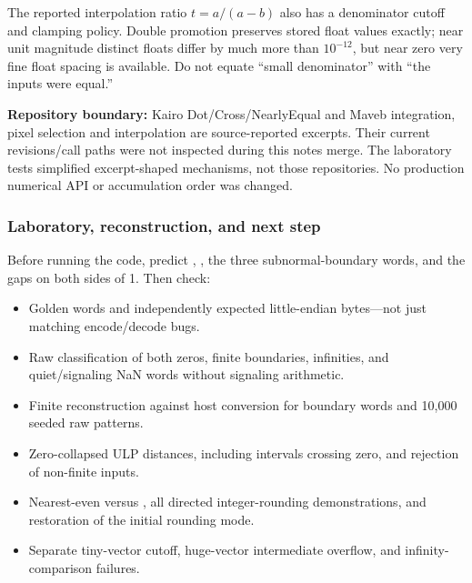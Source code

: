The reported interpolation ratio \(t=a/(a-b)\) also has a denominator cutoff and clamping policy. Double promotion preserves stored float values exactly; near unit magnitude distinct floats differ by much more than \(10^{-12}\), but near zero very fine float spacing is available. Do not equate ``small denominator'' with ``the inputs were equal.''

\textbf{Repository boundary:} Kairo Dot/Cross/NearlyEqual and Maveb integration, pixel selection and interpolation are source-reported excerpts. Their current revisions/call paths were not inspected during this notes merge. The laboratory tests simplified excerpt-shaped mechanisms, not those repositories. No production numerical API or accumulation order was changed.

\subsubsection{Laboratory, reconstruction, and next step}\label{05-engine-i-ch001-laboratory-reconstruction-and-next-step}

\hypertarget{05-engine-i-ch001-laboratory-reconstruction-and-next-step}{}

Before running the code, predict , , the three subnormal-boundary words, and the gaps on both sides of 1. Then check:

\begin{itemize}
\tightlist
\item
  Golden words and independently expected little-endian bytes---not just matching encode/decode bugs.
\item
  Raw classification of both zeros, finite boundaries, infinities, and quiet/signaling NaN words without signaling arithmetic.
\item
  Finite reconstruction against host conversion for boundary words and 10,000 seeded raw patterns.
\item
  Zero-collapsed ULP distances, including intervals crossing zero, and rejection of non-finite inputs.
\item
  Nearest-even versus , all directed integer-rounding demonstrations, and restoration of the initial rounding mode.
\item
  Separate tiny-vector cutoff, huge-vector intermediate overflow, and infinity-comparison failures.
\end{itemize}

